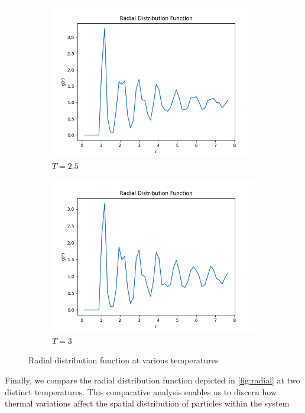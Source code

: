 \documentclass{article}
\begin{document}
\begin{figure}[H]
\begin{subfigure}{0.495\textwidth}
        \includegraphics[width=\textwidth]{images/Radial2.5.png}
        \caption{$T=2.5$}
    \end{subfigure}
    \hfill
    \begin{subfigure}{0.495\textwidth}
        \centering
        \includegraphics[width=\textwidth]{images/Radial3.png}
        \caption{$T=3$}
    \end{subfigure}
    
    \caption{Radial distribution function at various temperatures}
\end{figure}
\noindent Finally, we compare the radial distribution function depicted in \autoref{fig:radial} at two distinct temperatures. This comparative analysis enables us to discern how thermal variations affect the spatial distribution of particles within the system
\end{document}
